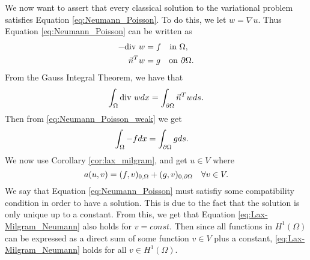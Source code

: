We now want to assert that every classical solution to the variational problem satisfies Equation \eqref{eq:Neumann_Poisson}.
To do this, we let $w=\nabla u$. Thus Equation \eqref{eq:Neumann_Poisson} can be written as
\begin{align}\label{eq:Neumann_Poisson_weak}
\begin{split}
    -\text{div } w &= f \quad \text{in } \Omega, \\
    \vec{n}^Tw &= g \quad \text{on } \partial \Omega.
\end{split}    
\end{align}
From the Gauss Integral Theorem, we have that
\[\int_{\Omega} \text{div } w dx = \int_{\partial \Omega} \vec{n}^Tw ds.\]
Then from \eqref{eq:Neumann_Poisson_weak} we get
\begin{align}
\begin{split}
\int_{\Omega} -f dx &= \int_{\partial \Omega} g ds.
\end{split}
\end{align}
We now use Corollary \ref{cor:lax_milgram}, and get $u\in V$ where
\begin{equation}\label{eq:Lax-Milgram_Neumann}
  a(u,v) = (f,v)_{0,\Omega} + (g,v)_{0,\partial \Omega} \quad \forall v\in V.  
\end{equation}
We say that Equation \eqref{eq:Neumann_Poisson} must satisfiy some compatibility condition in order to have a solution.
 This is due to the fact that the solution is only unique up to a constant.
  From this, we get that Equation \ref{eq:Lax-Milgram_Neumann} also holds for $v=const$.
Then since all functions in $H^1(\Omega)$ can be expressed as a direct sum of some function $v\in V$ plus a constant, \eqref{eq:Lax-Milgram_Neumann} holds for all $v\in H^1(\Omega)$.